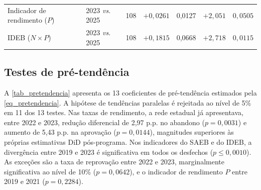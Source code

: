 \begin{table}[!htb]
\begin{tabular}{llcrrrr}
        Indicador de rendimento ($P$) & 2023 \textit{vs.} 2025 & 108 & $+0{,}0261$ & 0,0127 & $+2{,}051$ & $0{,}0505$ \\
        IDEB ($N \times P$)          & 2023 \textit{vs.} 2025 & 108 & $+0{,}1815$ & 0,0668 & $+2{,}718$ & $0{,}0115$ \\
        \bottomrule
    \end{tabular}
\end{table}

\subsection{Testes de pré-tendência}
\label{subsec_resultados_pretendencia}

A \autoref{tab_pretendencia} apresenta os 13 coeficientes de pré-tendência estimados pela \autoref{eq_pretendencia}.
A hipótese de tendências paralelas é rejeitada ao nível de 5\% em 11 dos 13 testes.
Nas taxas de rendimento, a rede estadual já apresentava, entre 2022 e 2023, redução diferencial de 2,97 p.p. no abandono ($p = 0{,}0031$) e aumento de 5,43 p.p. na aprovação ($p = 0{,}0144$), magnitudes superiores às próprias estimativas DiD pós-programa.
Nos indicadores do SAEB e do IDEB, a divergência entre 2019 e 2023 é significativa em todos os desfechos ($p \leq 0{,}0010$).
As exceções são a taxa de reprovação entre 2022 e 2023, marginalmente significativa ao nível de 10\% ($p = 0{,}0642$), e o indicador de rendimento $P$ entre 2019 e 2021 ($p = 0{,}2284$).

